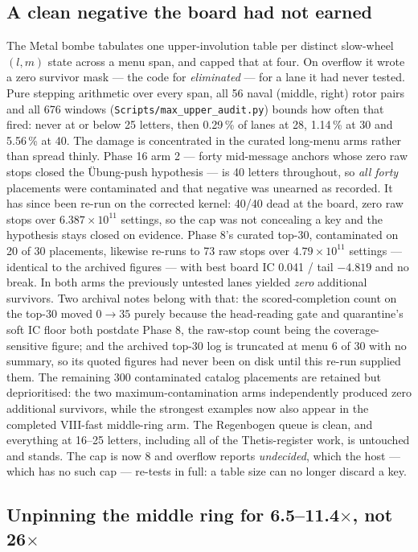\documentclass[11pt,a4paper]{article}
\begin{document}
\subsection{A clean negative the board had not earned}

The Metal bombe tabulates one upper-involution table per distinct slow-wheel
$(l,m)$ state across a menu span, and capped that at four.
On overflow it wrote a zero survivor mask --- the code for \emph{eliminated} ---
for a lane it had never tested.
Pure stepping arithmetic over every span, all 56 naval (middle, right) rotor
pairs and all 676 windows (\texttt{Scripts/max\_upper\_audit.py}) bounds how
often that fired: never at or below 25 letters, then 0.29\,\% of lanes at 28,
1.14\,\% at 30 and 5.56\,\% at 40.
The damage is concentrated in the curated long-menu arms rather than spread
thinly.
Phase 16 arm 2 --- forty mid-message anchors whose zero raw stops closed the
\"Ubung-push hypothesis --- is 40 letters throughout, so \emph{all forty}
placements were contaminated and that negative was unearned as recorded.
It has since been re-run on the corrected kernel: 40/40 dead at the board, zero
raw stops over $6.387\times10^{11}$ settings, so the cap was not concealing a key
and the hypothesis stays closed on evidence.
Phase 8's curated top-30, contaminated on 20 of 30 placements, likewise re-runs to
73 raw stops over $4.79\times10^{11}$ settings --- identical to the archived
figures --- with best board IC 0.041 / tail $-4.819$ and no break.
In both arms the previously untested lanes yielded \emph{zero} additional
survivors.
Two archival notes belong with that: the scored-completion count on the top-30
moved $0\to35$ purely because the head-reading gate and quarantine's soft IC floor
both postdate Phase 8, the raw-stop count being the coverage-sensitive figure; and
the archived top-30 log is truncated at menu 6 of 30 with no summary, so its quoted
figures had never been on disk until this re-run supplied them.
The remaining 300 contaminated catalog placements are retained but deprioritised: the two
maximum-contamination arms independently produced zero additional survivors, while the
strongest examples now also appear in the completed VIII-fast middle-ring arm.
The Regenbogen queue is clean, and everything at 16--25 letters, including all of
the Thetis-register work, is untouched and stands.
The cap is now 8 and overflow reports \emph{undecided}, which the host --- which
has no such cap --- re-tests in full: a table size can no longer discard a key.

\subsection{Unpinning the middle ring for 6.5--11.4$\times$, not 26$\times$}
\end{document}
